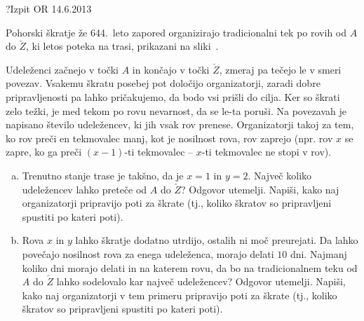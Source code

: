 \begin{naloga}{?}{Izpit OR 14.6.2013}
\begin{vprasanje}
Pohorski škratje že 644.~leto zapored
organizirajo tradicionalni tek po rovih od $A$ do $\check{Z}$,
ki letos poteka na trasi, prikazani na sliki~\fig{}.

Udeleženci začnejo v točki $A$ in končajo v točki $\check{Z}$,
zmeraj pa tečejo le v smeri povezav.
Vsakemu škratu posebej pot določijo organizatorji,
zaradi dobre pripravljenosti pa lahko pričakujemo,
da bodo vsi prišli do cilja.
Ker so škrati zelo težki,
je med tekom po rovu nevarnost, da se le-ta poruši.
Na povezavah je napisano število udeležencev, ki jih vsak rov prenese.
Organizatorji takoj za tem, ko rov preči en tekmovalec manj,
kot je nosilnost rova, rov zaprejo
(npr. rov $x$ se zapre, ko ga preči $(x-1)$-ti tekmovalec
-- $x$-ti tekmovalec ne stopi v rov).

\begin{enumerate}[(a)]
\item Trenutno stanje trase je takšno, da je $x = 1$ in $y = 2$.
Največ koliko udeležencev lahko preteče od $A$ do $\check{Z}$?
Odgovor utemelji.
Napiši, kako naj organizatorji pripravijo poti za škrate
(tj., koliko škratov so pripravljeni spustiti po kateri poti).

\item Rova $x$ in $y$ lahko škratje dodatno utrdijo,
ostalih ni moč preurejati.
Da lahko povečajo nosilnost rova za enega udeleženca, morajo delati $10$ dni.
Najmanj koliko dni morajo delati in na katerem rovu,
da bo na tradicionalnem teku od $A$ do $\check{Z}$
lahko sodelovalo kar največ udeležencev?
Odgovor utemelji.
Napiši, kako naj organizatorji v tem primeru pripravijo poti za škrate
(tj., koliko škratov so pripravljeni spustiti po kateri poti).
\end{enumerate}

\begin{slika}
\pgfslika
{}
\end{slika}
\end{vprasanje}
\begin{odgovor}
\end{odgovor}
\end{naloga}
